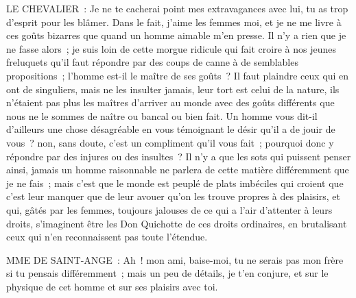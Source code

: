 \documentclass[french,twoside]{book} %
\begin{document}
LE CHEVALIER : Je ne te cacherai point mes extravagances avec lui, tu as trop d’esprit pour les blâmer. Dans le fait, j’aime les femmes moi, et je ne me livre à ces goûts bizarres que quand un homme aimable m’en presse. Il n’y a rien que je ne fasse alors ; je suis loin de cette morgue ridicule qui fait croire à nos jeunes freluquets qu’il faut répondre par des coups de canne à de semblables propositions ; l’homme est-il le maître de ses goûts ? Il faut plaindre ceux qui en ont de singuliers, mais ne les insulter jamais, leur tort est celui de la nature, ils n’étaient pas plus les maîtres d’arriver au monde avec des goûts différents que nous ne le sommes de naître ou bancal ou bien fait. Un homme vous dit-il d’ailleurs une chose désagréable en vous témoignant le désir qu’il a de jouir de vous ? non, sans doute, c’est un compliment qu’il vous fait ; pourquoi donc y répondre par des injures ou des insultes ? Il n’y a que les sots qui puissent penser ainsi, jamais un homme raisonnable ne parlera de cette matière différemment que je ne fais ; mais c’est que le monde est peuplé de plats imbéciles qui croient que c’est leur manquer que de leur avouer qu’on les trouve propres à des plaisirs, et qui, gâtés par les femmes, toujours jalouses de ce qui a l’air d’attenter à leurs droits, s’imaginent être les Don Quichotte de ces droits ordinaires, en brutalisant ceux qui n’en reconnaissent pas toute l’étendue.\par
MME DE SAINT-ANGE : Ah ! mon ami, baise-moi, tu ne serais pas mon frère si tu pensais différemment ; mais un peu de détails, je t’en conjure, et sur le physique de cet homme et sur ses plaisirs avec toi.\par
\end{document}
